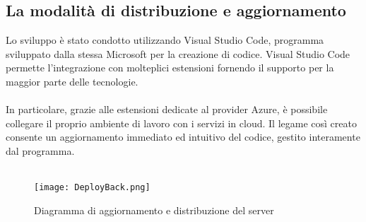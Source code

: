 \clearpage

\subsection{La modalità di distribuzione e aggiornamento}
Lo sviluppo è stato condotto utilizzando Visual Studio Code, 
programma sviluppato dalla stessa Microsoft per la creazione di codice.
Visual Studio Code permette l'integrazione con molteplici estensioni fornendo il supporto
per la maggior parte delle tecnologie.\\
\\
In particolare, grazie alle estensioni dedicate al provider Azure, 
è possibile collegare il proprio ambiente di lavoro con i servizi in cloud.
Il legame così creato consente un aggiornamento immediato ed intuitivo del codice, 
gestito interamente dal programma.\\
\\
\begin{figure}[h!]
    \begin{center}
        \texttt{[image: DeployBack.png]}
        \caption{Diagramma di aggiornamento e distribuzione del server}
    \end{center}
\end{figure}

\clearpage

